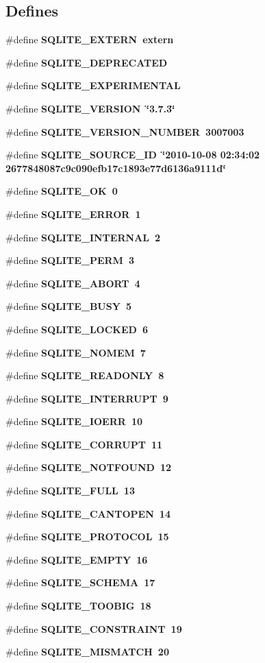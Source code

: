 \subsection*{Defines}
\begin{CompactItemize}
\item 
\#define \bf{SQLITE\_\-EXTERN}~extern
\item 
\#define \bf{SQLITE\_\-DEPRECATED}
\item 
\#define \bf{SQLITE\_\-EXPERIMENTAL}
\item 
\#define \bf{SQLITE\_\-VERSION}~\char`\"{}3.7.3\char`\"{}
\item 
\#define \bf{SQLITE\_\-VERSION\_\-NUMBER}~3007003
\item 
\#define \bf{SQLITE\_\-SOURCE\_\-ID}~\char`\"{}2010-10-08 02:34:02 2677848087c9c090efb17c1893e77d6136a9111d\char`\"{}
\item 
\#define \bf{SQLITE\_\-OK}~0
\item 
\#define \bf{SQLITE\_\-ERROR}~1
\item 
\#define \bf{SQLITE\_\-INTERNAL}~2
\item 
\#define \bf{SQLITE\_\-PERM}~3
\item 
\#define \bf{SQLITE\_\-ABORT}~4
\item 
\#define \bf{SQLITE\_\-BUSY}~5
\item 
\#define \bf{SQLITE\_\-LOCKED}~6
\item 
\#define \bf{SQLITE\_\-NOMEM}~7
\item 
\#define \bf{SQLITE\_\-READONLY}~8
\item 
\#define \bf{SQLITE\_\-INTERRUPT}~9
\item 
\#define \bf{SQLITE\_\-IOERR}~10
\item 
\#define \bf{SQLITE\_\-CORRUPT}~11
\item 
\#define \bf{SQLITE\_\-NOTFOUND}~12
\item 
\#define \bf{SQLITE\_\-FULL}~13
\item 
\#define \bf{SQLITE\_\-CANTOPEN}~14
\item 
\#define \bf{SQLITE\_\-PROTOCOL}~15
\item 
\#define \bf{SQLITE\_\-EMPTY}~16
\item 
\#define \bf{SQLITE\_\-SCHEMA}~17
\item 
\#define \bf{SQLITE\_\-TOOBIG}~18
\item 
\#define \bf{SQLITE\_\-CONSTRAINT}~19
\item 
\#define \bf{SQLITE\_\-MISMATCH}~20
\item 

\end{CompactItemize}
